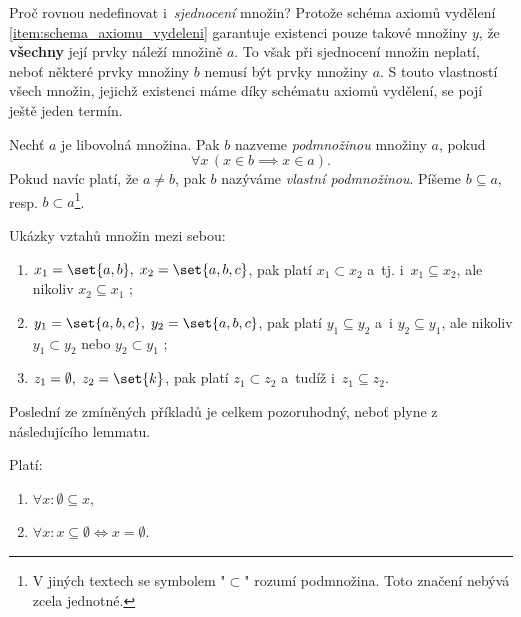 Proč rovnou nedefinovat i~\emph{sjednocení} množin? Protože schéma axiomů vydělení \ref{item:schema_axiomu_vydeleni} garantuje existenci pouze takové množiny $y$, že \textbf{všechny} její prvky náleží množině $a$. To však při sjednocení množin neplatí, neboť některé prvky množiny $b$ nemusí být prvky množiny $a$. S touto vlastností všech množin, jejichž existenci máme díky schématu axiomů vydělení, se pojí ještě jeden termín.
\begin{definition}\label{def:podmnozina}
    Nechť $a$ je libovolná množina. Pak $b$ nazveme \emph{podmnožinou} množiny $a$, pokud
    \begin{equation*}
        \forall x\,(x\in b \implies x\in a).
    \end{equation*}
    Pokud navíc platí, že $a\neq b$, pak $b$ nazýváme \emph{vlastní podmnožinou}. Píšeme $b\subseteq a$, resp. $b\subset a$\footnote{V jiných textech se symbolem "$\subset$" rozumí podmnožina. Toto značení nebývá zcela jednotné.}.
\end{definition}
\begin{example}
    Ukázky vztahů množin mezi sebou:
    \begin{enumerate}[label=(\roman*)]
        \item $x_1=\set{a,b},\; x_2=\set{a,b,c}$, pak platí $x_1 \subset x_2$ a~tj. i~$x_1 \subseteq x_2$, ale nikoliv $x_2 \subseteq x_1$ ;
        \item $y_1=\set{a,b,c},\; y_2=\set{a,b,c}$, pak platí $y_1 \subseteq y_2$ a~i $y_2 \subseteq y_1$, ale nikoliv $y_1 \subset y_2$ nebo $y_2 \subset y_1$ ;
        \item $z_1=\emptyset,\; z_2=\set{k}$, pak platí $z_1 \subset z_2$ a~tudíž i~$z_1 \subseteq z_2$.
    \end{enumerate}
\end{example}
Poslední ze zmíněných příkladů je celkem pozoruhodný, neboť plyne z následujícího lemmatu.
\begin{lemma}\label{lem:o_prazdne_mnozine}
    Platí:
    \begin{enumerate}[label=(\roman*)]
        \item\label{item:prazdna_mnozina_i} $\forall x: \emptyset\subseteq x$,
        \item\label{item:prazdna_mnozina_ii} $\forall x: x\subseteq\emptyset\iff x=\emptyset$.
    \end{enumerate}
\end{lemma}
